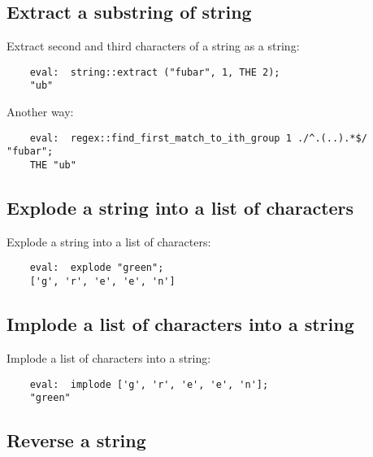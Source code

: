 \cutend*



\subsection{Extract a substring of string}

Extract second and third characters of a string as a string:
\begin{verbatim}
    eval:  string::extract ("fubar", 1, THE 2);
    "ub"
\end{verbatim}

Another way:
\begin{verbatim}
    eval:  regex::find_first_match_to_ith_group 1 ./^.(..).*$/ "fubar";
    THE "ub"
\end{verbatim}

\cutend*

\subsection{Explode a string into a list of characters}

Explode a string into a list of characters:
\begin{verbatim}
    eval:  explode "green";
    ['g', 'r', 'e', 'e', 'n']
\end{verbatim}

\cutend*

\subsection{Implode a list of characters into a string}

Implode a list of characters into a string:
\begin{verbatim}
    eval:  implode ['g', 'r', 'e', 'e', 'n'];
    "green"
\end{verbatim}

\cutend*

\subsection{Reverse a string}

